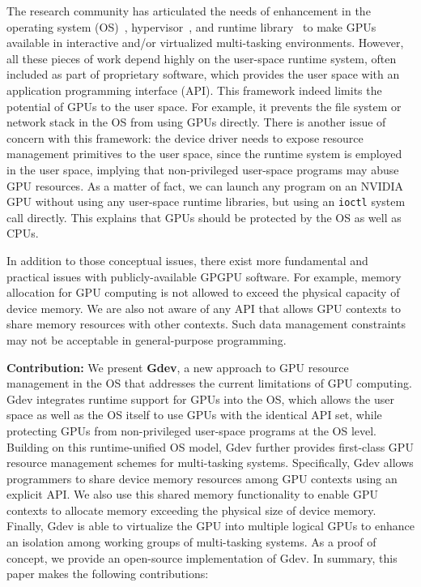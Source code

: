 The research community has articulated the needs of enhancement in 
the operating system (OS)~\cite{Bautin_MCNC08, Kato_ATC11,
Rossbach_SOSP11}, hypervisor~\cite{Gupta_ATC11}, and runtime
library~\cite{Kato_RTSS11} to make GPUs available in interactive
and/or virtualized multi-tasking environments.
However, all these pieces of work depend highly on the user-space
runtime system, often included as part of proprietary software, which provides
the user space with an application programming interface (API).
This framework indeed limits the potential of GPUs to the user space.
For example, it prevents the file system or network stack in the OS from
using GPUs directly.
There is another issue of concern with this framework: the device driver
needs to expose resource management primitives to the user space, since
the runtime system is employed in the user space, implying that non-privileged user-space programs may abuse GPU
resources.
As a matter of fact, we can launch any program on an NVIDIA GPU without
using any user-space runtime libraries, but using an \texttt{ioctl}
system call directly. 
This explains that GPUs should be protected by the OS as well as CPUs.

In addition to those conceptual issues, there exist more fundamental and
practical issues with publicly-available GPGPU software.
For example, memory allocation for GPU computing is not allowed to
exceed the physical capacity of device memory.
We are also not aware of any API that allows GPU contexts to share
memory resources with other contexts.
Such data management constraints may not be acceptable in
general-purpose programming.

\textbf{Contribution:}
We present \textbf{Gdev}, a new approach to GPU resource management in
the OS that
addresses the current limitations of GPU computing.
Gdev integrates runtime support for GPUs into the OS, which allows the
user space as well as the OS itself to use GPUs with the identical API
set, while protecting GPUs from non-privileged user-space programs at
the OS level.
Building on this runtime-unified OS model, Gdev further provides
first-class GPU resource management schemes for multi-tasking systems.
Specifically, Gdev allows programmers to share device memory resources
among GPU contexts using an explicit API.
We also use this shared memory functionality to enable GPU contexts to
allocate memory exceeding the physical size of device memory.
Finally, Gdev is able to virtualize the GPU into multiple logical
GPUs to enhance an isolation among working groups of multi-tasking
systems.
As a proof of concept, we provide an open-source implementation of Gdev.
In summary, this paper makes the following contributions:

